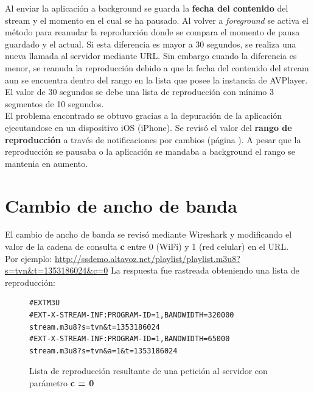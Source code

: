 Al enviar la aplicación a background se guarda la \textbf{fecha del contenido} del stream y el momento en el cual se ha pausado.
Al volver a \textit{foreground} se activa el método para reanudar la reproducción donde se compara el momento de pausa guardado y el actual. Si esta diferencia es mayor a 30 segundos, se realiza una nueva llamada al servidor mediante URL. Sin embargo cuando la diferencia es menor, se reanuda la reproducción debido a que la fecha del contenido del stream aun se encuentra dentro del rango en la lista que posee la instancia de AVPlayer.\\

El valor de 30 segundos se debe una lista de reproducción con mínimo 3 segmentos de 10 segundos.\\

El problema encontrado se obtuvo gracias a la depuración de la aplicación ejecutandose en un dispositivo iOS (iPhone). Se revisó el valor del \textbf{rango de reproducción} a través de notificaciones por cambios (página \pageref{item:seekableTimeRanges}). A pesar que la reproducción se pausaba o la aplicación se mandaba a background el rango se mantenia en aumento.


\section{Cambio de ancho de banda}

El cambio de ancho de banda se revisó mediante Wireshark y modificando el valor de la cadena de consulta \textbf{c} entre 0 (WiFi) y 1 (red celular) en el URL.\\ 

Por ejemplo: \url{http://ssdemo.altavoz.net/playlist/playlist.m3u8?s=tvn&t=1353186024&c=0}
La respuesta fue rastreada obteniendo una lista de reproducción:

\begin{figure}[H]
	\centering
\begin{lstlisting}
#EXTM3U
#EXT-X-STREAM-INF:PROGRAM-ID=1,BANDWIDTH=320000
stream.m3u8?s=tvn&t=1353186024
#EXT-X-STREAM-INF:PROGRAM-ID=1,BANDWIDTH=65000
stream.m3u8?s=tvn&a=1&t=1353186024
\end{lstlisting}
\caption{Lista de reproducción resultante de una petición al servidor con parámetro \textbf{c = 0}}
\label{lst:playlistc0}
\end{figure}


